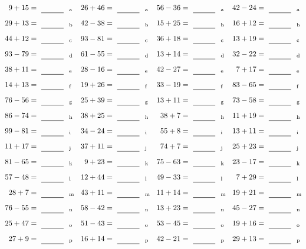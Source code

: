 \documentclass
[
  draft    = true,
  fontsize = 11pt,
  parskip  = half-
]
{scrartcl}
\begin{document}
\clearpage
\begin{align*}
    \pline{9+15}&=\rline{a}
  & \pline{26+46}&=\rline{a}
  & \pline{56-36}&=\rline{a}
  & \pline{42-24}&=\rline{a} \\[1ex]
    \pline{29+13}&=\rline{b}
  & \pline{42-38}&=\rline{b}
  & \pline{15+25}&=\rline{b}
  & \pline{16+12}&=\rline{b} \\[1ex]
    \pline{44+12}&=\rline{c}
  & \pline{93-81}&=\rline{c}
  & \pline{36+18}&=\rline{c}
  & \pline{13+19}&=\rline{c} \\[1ex]
    \pline{93-79}&=\rline{d}
  & \pline{61-55}&=\rline{d}
  & \pline{13+14}&=\rline{d}
  & \pline{32-22}&=\rline{d} \\[1ex]
    \pline{38+11}&=\rline{e}
  & \pline{28-16}&=\rline{e}
  & \pline{42-27}&=\rline{e}
  & \pline{7+17}&=\rline{e} \\[1ex]
    \pline{14+13}&=\rline{f}
  & \pline{19+26}&=\rline{f}
  & \pline{33-19}&=\rline{f}
  & \pline{83-65}&=\rline{f} \\[1ex]
    \pline{76-56}&=\rline{g}
  & \pline{25+39}&=\rline{g}
  & \pline{13+11}&=\rline{g}
  & \pline{73-58}&=\rline{g} \\[1ex]
    \pline{86-74}&=\rline{h}
  & \pline{38+25}&=\rline{h}
  & \pline{38+7}&=\rline{h}
  & \pline{11+19}&=\rline{h} \\[1ex]
    \pline{99-81}&=\rline{i}
  & \pline{34-24}&=\rline{i}
  & \pline{55+8}&=\rline{i}
  & \pline{13+11}&=\rline{i} \\[1ex]
    \pline{11+17}&=\rline{j}
  & \pline{37+11}&=\rline{j}
  & \pline{74+7}&=\rline{j}
  & \pline{25+23}&=\rline{j} \\[1ex]
    \pline{81-65}&=\rline{k}
  & \pline{9+23}&=\rline{k}
  & \pline{75-63}&=\rline{k}
  & \pline{23-17}&=\rline{k} \\[1ex]
    \pline{57-48}&=\rline{l}
  & \pline{12+44}&=\rline{l}
  & \pline{49-33}&=\rline{l}
  & \pline{7+29}&=\rline{l} \\[1ex]
    \pline{28+7}&=\rline{m}
  & \pline{43+11}&=\rline{m}
  & \pline{11+14}&=\rline{m}
  & \pline{19+21}&=\rline{m} \\[1ex]
    \pline{76-55}&=\rline{n}
  & \pline{58-42}&=\rline{n}
  & \pline{13+23}&=\rline{n}
  & \pline{45-27}&=\rline{n} \\[1ex]
    \pline{25+47}&=\rline{o}
  & \pline{51-43}&=\rline{o}
  & \pline{53-45}&=\rline{o}
  & \pline{19+16}&=\rline{o} \\[1ex]
    \pline{27+9}&=\rline{p}
  & \pline{16+14}&=\rline{p}
  & \pline{42-21}&=\rline{p}
  & \pline{29+13}&=\rline{p}
\end{align*}
\end{document}
